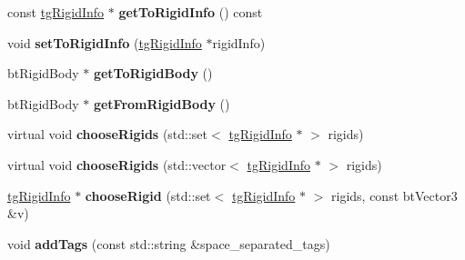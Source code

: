 \begin{DoxyCompactItemize}
\item 
\hypertarget{classtg_connector_info_a90f0e0a9310321830ae3eb698316b92d}{const \hyperlink{classtg_rigid_info}{tg\-Rigid\-Info} $\ast$ {\bfseries get\-To\-Rigid\-Info} () const }\label{classtg_connector_info_a90f0e0a9310321830ae3eb698316b92d}

\item 
\hypertarget{classtg_connector_info_aa0200180014d2e36a2539b9e2b955077}{void {\bfseries set\-To\-Rigid\-Info} (\hyperlink{classtg_rigid_info}{tg\-Rigid\-Info} $\ast$rigid\-Info)}\label{classtg_connector_info_aa0200180014d2e36a2539b9e2b955077}

\item 
\hypertarget{classtg_connector_info_aa7eb43322b60e7e0ee833080e8465098}{bt\-Rigid\-Body $\ast$ {\bfseries get\-To\-Rigid\-Body} ()}\label{classtg_connector_info_aa7eb43322b60e7e0ee833080e8465098}

\item 
\hypertarget{classtg_connector_info_a81ac443e92d4fb486116c37ab75872cd}{bt\-Rigid\-Body $\ast$ {\bfseries get\-From\-Rigid\-Body} ()}\label{classtg_connector_info_a81ac443e92d4fb486116c37ab75872cd}

\item 
\hypertarget{classtg_connector_info_a3a0518a4b3be39813a993f366de70fdc}{virtual void {\bfseries choose\-Rigids} (std\-::set$<$ \hyperlink{classtg_rigid_info}{tg\-Rigid\-Info} $\ast$ $>$ rigids)}\label{classtg_connector_info_a3a0518a4b3be39813a993f366de70fdc}

\item 
\hypertarget{classtg_connector_info_a09a229040fac476ae2ad2f6e138aebe9}{virtual void {\bfseries choose\-Rigids} (std\-::vector$<$ \hyperlink{classtg_rigid_info}{tg\-Rigid\-Info} $\ast$ $>$ rigids)}\label{classtg_connector_info_a09a229040fac476ae2ad2f6e138aebe9}

\item 
\hypertarget{classtg_connector_info_a9e311f259b07b3e07d5b82612370212d}{\hyperlink{classtg_rigid_info}{tg\-Rigid\-Info} $\ast$ {\bfseries choose\-Rigid} (std\-::set$<$ \hyperlink{classtg_rigid_info}{tg\-Rigid\-Info} $\ast$ $>$ rigids, const bt\-Vector3 \&v)}\label{classtg_connector_info_a9e311f259b07b3e07d5b82612370212d}

\item 
\hypertarget{classtg_taggable_af0b8f1729653b0b90d2fecbd51163612}{void {\bfseries add\-Tags} (const std\-::string \&space\-\_\-separated\-\_\-tags)}\label{classtg_taggable_af0b8f1729653b0b90d2fecbd51163612}


\end{DoxyCompactItemize}
